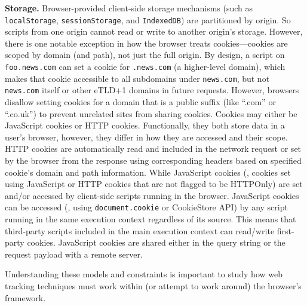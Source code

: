 \noindent \textbf{Storage.} 
%
Browser-provided client-side storage mechanisms (such as \texttt{localStorage}, \texttt{sessionStorage}, and \texttt{IndexedDB}) are partitioned by origin.
%
So scripts from one origin cannot read or write to another origin’s storage. 
%
However, there is one notable exception in how the browser treats cookies---cookies are scoped by domain (and path), not just the full origin. 
%
By design, a script on \texttt{foo.news.com} can set a cookie for \texttt{.news.com} (a higher-level domain), which makes that cookie accessible to all subdomains under \texttt{news.com}, but not \texttt{news.com} itself or other eTLD+1 domains in future requests. 
%
However, browsers disallow setting cookies for a domain that is a public suffix (like ``.com'' or ``.co.uk'') to prevent unrelated sites from sharing cookies.
%
Cookies may either be JavaScript cookies or HTTP cookies. 
%
Functionally, they both store data in a user's browser, however, they differ in how they are accessed and their scope.
%
HTTP cookies are automatically read and included in the network request or set by the browser from the response using corresponding headers based on specified cookie's domain and path information.
%
While JavaScript cookies (\ie{}, cookies set using JavaScript or HTTP cookies that are not flagged to be HTTPOnly) are set and/or accessed by client-side scripts running in the browser. 
%
JavaScript cookies can be accessed (\eg{}, using \texttt{document.cookie} or CookieStore API) by any script running in the same execution context regardless of its source. 
%
This means that third-party scripts included in the main execution context can read/write first-party cookies. 
%
JavaScript cookies are shared either in the query string or the request payload with a remote server.


Understanding these models and constraints is important to study how web tracking techniques must work within (or attempt to work around) the browser’s framework.